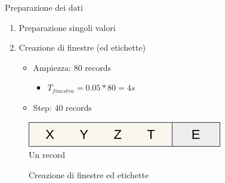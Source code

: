 \begin{tframe}{Preparazione dei dati}

    \begin{minipage}{0.57\textwidth}
        \begin{enumerate}
            \item Preparazione singoli valori
            \item Creazione di finestre (ed etichette)
                \begin{itemize}
                    \item Ampiezza: 80 records
                        \begin{itemize}
                            \item $T_{finestra} = 0.05 * 80 = 4s$
                        \end{itemize}
                    \item Step: 40 records
                \end{itemize}
    
        \end{enumerate}
    \end{minipage}%
    \hfill
    \begin{minipage}{0.43\textwidth}
        
        \begin{figure}
            \includegraphics[scale = 0.35]{assets/images/classification/record.png}
            \caption*{Un record}
        \end{figure}
        
    \end{minipage}%

    \vspace{3mm}
    \vfill
    \begin{figure}
        
        \caption*{Creazione di finestre ed etichette}
    \end{figure}

\end{tframe}